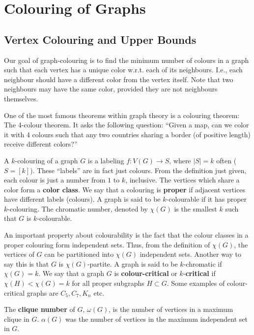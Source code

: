 \chapter{Colouring of Graphs}

\section{Vertex Colouring and Upper Bounds}%
\label{sec:label}

Our goal of graph-colouring is to find the minimum number of colours in a graph such that each vertex has a unique color w.r.t. each of its neighbours. I.e., each neighbour should have a different color from the vertex itself. Note that two neighbours may have the same color, provided they are not neighbours themselves.

One of the most famous theorems within graph theory is a colouring theorem: The 4-colour theorem. It asks the following question: ``Given a map, can we color it with 4 colours such that any two countries sharing a border (of positive length) receive different colors?''

A $k$-colouring of a graph $G$ is a labeling $f : V(G) \rightarrow S$, where $|S| = k$ often ($S = [k]$). These ``labels'' are in fact just colours. From the definition just given, each colour is just a number from $1$ to $k$, inclusive. The vertices which share a color form a \textbf{color class}. We say that a colouring is \textbf{proper} if adjacent vertices have different labels (colours). A graph is said to be $k$-colourable if it has proper $k$-colouring. The chromatic number, denoted by $\chi (G)$ is the smallest $k$ such that $G$ is $k$-colourable.

An important property about colourability is the fact that the colour classes in a proper colouring form independent sets. Thus, from the definition of $\chi (G)$, the vertices of $G$ can be partitioned into $\chi (G)$ independent sets. Another way to say this is that $G$ is $\chi (G)$-partite. A graph is said to be $k$-chromatic if $\chi (G) = k$. We say that a graph $G$ is \textbf{colour-critical} or $k$-\textbf{critical} if $\chi (H) < \chi (G) = k$ for all proper subgraphs $H \subset G$. Some examples of colour-critical graphs are $C_{5}, C_{7}, K_{n}$ etc.

The \textbf{clique number} of $G$, \(\omega(G)\), is the number of vertices in a maximum clique in $G$. $\alpha(G)$ was the number of vertices in the maximum independent set in $G$.

